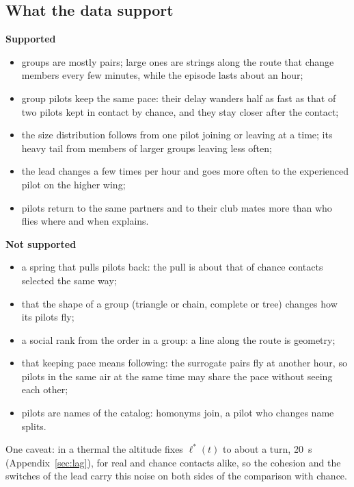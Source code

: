 \subsection{What the data support}\label{sec:conclusions}

\noindent
\begin{minipage}[t]{0.49\textwidth}
\textbf{Supported}
\begin{itemize}
  \item groups are mostly pairs; large ones are strings along the route that change members every
        few minutes, while the episode lasts about an hour;
  \item group pilots keep the same pace: their delay wanders half as fast as that of two pilots
        kept in contact by chance, and they stay closer after the contact;
  \item the size distribution follows from one pilot joining or leaving at a time; its heavy tail
        from members of larger groups leaving less often;
  \item the lead changes a few times per hour and goes more often to the experienced pilot on the
        higher wing;
  \item pilots return to the same partners and to their club mates more than who flies where and
        when explains.
\end{itemize}
\end{minipage}\hfill
\begin{minipage}[t]{0.49\textwidth}
\textbf{Not supported}
\begin{itemize}
  \item a spring that pulls pilots back: the pull is about that of chance contacts selected the
        same way;
  \item that the shape of a group (triangle or chain, complete or tree) changes how its pilots fly;
  \item a social rank from the order in a group: a line along the route is geometry;
  \item that keeping pace means following: the surrogate pairs fly at another hour, so pilots in
        the same air at the same time may share the pace without seeing each other;
  \item pilots are names of the catalog: homonyms join, a pilot who changes name splits.
\end{itemize}
\end{minipage}

\medskip
One caveat: in a thermal the altitude fixes $\ell^*(t)$ to about a turn, 20~s
(Appendix~\ref{sec:lag}), for real and chance contacts alike, so the cohesion and the switches of
the lead carry this noise on both sides of the comparison with chance.
